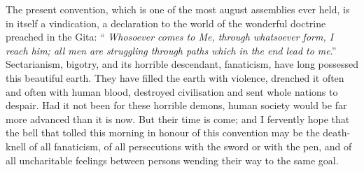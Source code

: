 The present convention, which is one of the most
august
assemblies ever held, is in itself a vindication, a declaration to the
world of the wonderful doctrine preached in the Gita: “ \textit{Whosoever
comes to Me, through whatsoever form, I reach him; all men are
struggling through paths which in the end lead to me}.”
Sectarianism, bigotry, and its horrible descendant, fanaticism, have
long possessed this beautiful earth. They have filled the earth with
violence, drenched it often and often with human blood, destroyed
civilisation and sent whole nations to despair. Had it not been for
these horrible demons, human society would be far more advanced than it
is now. But their time is come; and I fervently hope that the bell that
tolled this morning in honour of this convention may be the death-knell
of all fanaticism, of all persecutions with the sword or with the pen,
and of all uncharitable feelings between persons wending their way to
the same goal.\\

